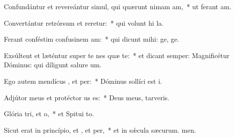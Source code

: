 \item Confundántur et revereántur simul, qui quærunt nimam am,~* ut ferant am.
\item Convertántur retrórsum et reretur:~* qui volunt hi la.
\item Ferant conféstim confusinem am:~* qui dicunt mihi: ge, ge.
\item Exsúltent et læténtur super te nes quæ te:~* et dicant semper: Magnificétur Dóminus: qui díligunt salure um.
\item Ego autem mendícus , et per:~* Dóminus sollíci est i.
\item Adjútor meus et protéctor us  es:~* Deus meus,  tarveris.
\item Glória tri, et o,~* et Spitui to.
\item Sicut erat in princípio, et , et per,~* et in sǽcula sæcurum. men.
